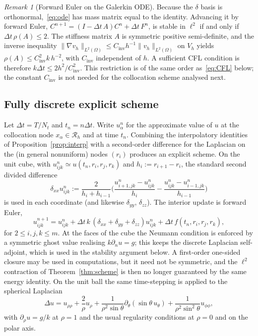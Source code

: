 \documentclass[final,3p,times]{elsarticle}
\theoremstyle{plain}
\theoremstyle{definition}
\theoremstyle{remark}
\newtheorem{remark}[theorem]{Remark}
\newcommand{\dziti}{\ensuremath{\delta}\text{-Ziti}}
\begin{document}
\begin{remark}[Forward Euler on the Galerkin ODE]
\label{rem:galerkin-euler}
Because the \dziti{} basis is orthonormal,~\eqref{eq:ode} has mass matrix
equal to the identity. Advancing it by forward Euler,
$C^{n+1}=(I-\Delta t\,A)C^n+\Delta t\,F^n$, is stable in $\ell^2$ if and
only if $\Delta t\,\rho(A)\le 2$. The stiffness matrix $A$ is symmetric
positive semi-definite, and the inverse inequality
$\lVert\nabla v_h\rVert_{L^2(\Omega)}\le C_{\mathrm{inv}}h^{-1}\lVert v_h\rVert_{L^2(\Omega)}$
on $V_h$ yields $\rho(A)\le C_{\mathrm{inv}}^2 k\,h^{-2}$, with
$C_{\mathrm{inv}}$ independent of $h$. A sufficient CFL condition is therefore
$k\Delta t\le 2h^2/C_{\mathrm{inv}}^2$. This restriction is of the same order
as~\eqref{eq:CFL} below; the constant $C_{\mathrm{inv}}$ is not needed for
the collocation scheme analysed next.
\end{remark}

\subsection{Fully discrete explicit scheme}

Let $\Delta t=T/N_t$ and $t_n=n\Delta t$. Write $u_\alpha^n$ for the
approximate value of $u$ at the collocation node $x_\alpha\in\mathcal{R}_h$
and at time $t_n$. Combining the interpolatory identities of
Proposition~\ref{prop:interp} with a second-order difference for the Laplacian
on the (in general nonuniform) nodes $(r_i)$ produces an explicit scheme. On
the unit cube, with $u_{ijk}^n\simeq u(t_n,r_i,r_j,r_k)$ and
$h_i:=r_{i+1}-r_i$, the standard second divided difference
\begin{equation}
\label{eq:dxx}
\delta_{xx}u_{ijk}^n
:=\frac{2}{h_i+h_{i-1}}
\Biggl(
\frac{u_{i+1,jk}^n-u_{ijk}^n}{h_i}
-\frac{u_{ijk}^n-u_{i-1,jk}^n}{h_{i-1}}
\Biggr)
\end{equation}
is used in each coordinate (and likewise $\delta_{yy}$, $\delta_{zz}$). The
interior update is forward Euler,
\begin{equation}
\label{eq:euler}
u_{ijk}^{n+1}
=u_{ijk}^n
+\Delta t\,k\,(\delta_{xx}+\delta_{yy}+\delta_{zz})u_{ijk}^n
+\Delta t\,f(t_n,r_i,r_j,r_k),
\end{equation}
for $2\le i,j,k\le m$. At the faces of the cube the Neumann condition is
enforced by a symmetric ghost value realising $k\partial_n u=g$; this keeps
the discrete Laplacian self-adjoint, which is used in the stability argument
below. A first-order one-sided closure may be used in computations, but it
need not be symmetric, and the $\ell^2$ contraction of Theorem~\ref{thm:scheme}
is then no longer guaranteed by the same energy identity. On the unit ball
the same time-stepping is applied to the spherical Laplacian
\begin{equation}
\label{eq:sph-lap}
\Delta u
=u_{\rho\rho}+\frac{2}{\rho}u_\rho
+\frac{1}{\rho^2\sin\theta}\partial_\theta(\sin\theta\,u_\theta)
+\frac{1}{\rho^2\sin^2\theta}u_{\phi\phi},
\end{equation}
with $\partial_\rho u=g/k$ at $\rho=1$ and the usual regularity conditions
at $\rho=0$ and on the polar axis.
\end{document}
